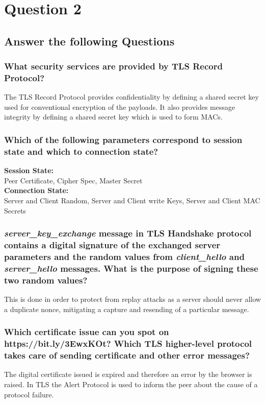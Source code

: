 \documentclass{report}
\begin{document}
	\section{Question 2}
	\startsection
		\renewcommand{\thesubsection}{\thesection.\Alph{subsection}}
		\subsection{Answer the following Questions}
		\startsubsection
			\subsubsection{What security services are provided by TLS Record Protocol?}
			\startsubsection
				The TLS Record Protocol provides confidentiality by defining a shared secret key used for conventional encryption of the payloads. It also provides message integrity by defining a shared secret key which is used to form MACs.
			\closesection
			\subsubsection{Which of the following parameters correspond to session state and which to connection state?}
			\startsubsection
				\textbf{Session State:} \\
				Peer Certificate, Cipher Spec, Master Secret \\
				\textbf{Connection State:} \\
				Server and Client Random, Server and Client write Keys, Server and Client MAC Secrets
			\closesection
			\subsubsection{\textit{server\_key\_exchange} message in TLS Handshake protocol contains a digital signature of the exchanged server parameters and the random values from \textit{client\_hello} and \textit{server\_hello} messages. What is the purpose of signing these two random values?}
			\startsubsection
				This is done in order to protect from replay attacks as a server should never allow a duplicate nonce, mitigating a capture and resending of a particular message.
			\closesection
			\subsubsection{Which certificate issue can you spot on https://bit.ly/3EwxKOt? Which TLS higher-level protocol takes care of sending certificate and other error messages?}
			\startsubsection
				The digital certificate issued is expired and therefore an error by the browser is raised. In TLS the Alert Protocol is used to inform the peer about the cause of a protocol failure.
			\closesection
		\closesection
		
\end{document}
